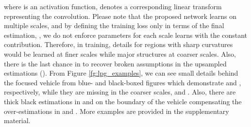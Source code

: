 \documentclass[10pt,twocolumn,letterpaper]{article}
\begin{document}
where  is an activation function,  denotes a corresponding linear transform representing the convolution.
Please note that the proposed network learns on multiple scales, and by defining the training loss only in terms of the final estimation, , we do not enforce parameters for each scale learns with the constant contribution.
Therefore, in training, details for regions with sharp curvatures would be learned at finer scales while major structures at coarser scales.
Also, there is the last chance in  to recover broken assumptions in the upsampled estimations ().
From Figure \ref{fg:lpg_examples}, we can see small details behind the focused vehicle from blue- and black-boxed figures which demonstrate  and , respectively, while they are missing in the coarser scales,  and .
Also, there are thick black estimations in  and  on the boundary of the vehicle compensating the over-estimations in  and .
More examples are provided in the supplementary material.
\end{document}
